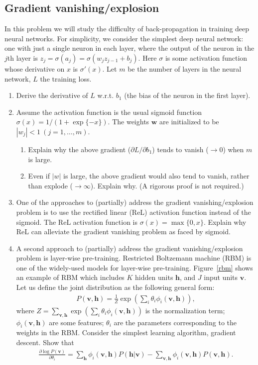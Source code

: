\subsection{Gradient vanishing/explosion}

In this problem we will study the difficulty of back-propagation in training deep neural networks. For simplicity, we consider the simplest deep neural network: one with just a single neuron in each layer, where the output of the neuron in the $j$th layer is $z_j = \sigma(a_j) = \sigma(w_jz_{j-1}+b_j)$. Here $\sigma$ is some activation function whose derivative on $x$ is $\sigma'(x)$. Let $m$ be the number of layers in the neural network, $L$ the training loss.

\begin{enumerate}
\item Derive the derivative of $L$ w.r.t. $b_1$ (the bias of the neuron in the first layer).
\item Assume the activation function is the usual sigmoid function $\sigma(x) = 1/(1+\exp\{-x\})$. The weights $\bm{w}$ are initialized to be $|w_j| < 1\ (j=1,\dots,m)$.
    \begin{enumerate}
    \item Explain why the above gradient ($\partial L/\partial b_1$) tends to vanish ($\to 0$) when $m$ is large.
    \item Even if $|w|$ is large, the above gradient would also tend to vanish, rather than explode ($\to\infty$). Explain why. (A rigorous proof is not required.)
    \end{enumerate}
\item One of the approaches to (partially) address the gradient vanishing/explosion problem is to use the rectified linear (ReL) activation function instead of the sigmoid. The ReL activation function is $\sigma(x) = \max\{0, x\}$. Explain why ReL can alleviate the gradient vanishing problem as faced by sigmoid.
\item A second approach to (partially) address the gradient vanishing/explosion problem is layer-wise pre-training. Restricted Boltzemann machine (RBM) is one of the widely-used models for layer-wise pre-training. Figure~\ref{rbm} shows an example of RBM which includes $K$ hidden units $\bm{h}$, and $J$ input units $\bm{v}$. Let us define the joint distribution as the following general form:
\begin{align}
P(\bm{v}, \bm{h}) = \frac{1}{Z}\exp\left( \sum_{i}\theta_{i}\phi_{i}(\bm{v},\bm{h}) \right),
\end{align}
where $Z=\sum_{\bm{v},\bm{h}}\exp\left( \sum_{i}\theta_{i}\phi_{i}(\bm{v},\bm{h}) \right)$ is the normalization term; $\phi_{i}(\bm{v},\bm{h})$ are some features; $\theta_{i}$ are the parameters corresponding to the weights in the RBM. Consider the simplest learning algorithm, gradient descent. Show that
\begin{align}
\frac{\partial \log P(\bm{v})}{\partial \theta_{i}} = \sum_{\bm{h}}\phi_{i}(\bm{v},\bm{h})P(\bm{h}|\bm{v}) - \sum_{\bm{v},\bm{h}}\phi_{i}(\bm{v},\bm{h})P(\bm{v},\bm{h}).
\end{align}
\end{enumerate}

